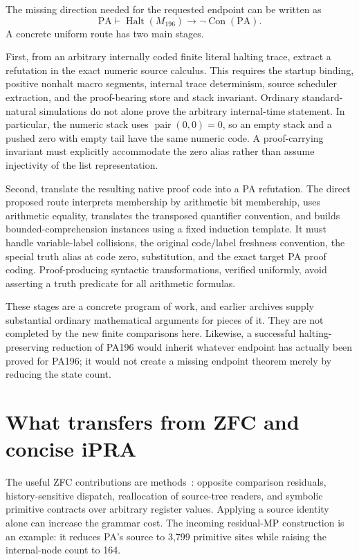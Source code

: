 \documentclass[11pt,letterpaper]{article}
\newcommand{\PA}{\mathrm{PA}}
\newcommand{\Con}{\operatorname{Con}}
\newcommand{\Halt}{\operatorname{Halt}}
\newcommand{\imp}{\mathbin{\to}}
\newcommand{\pair}{\operatorname{pair}}
\begin{document}
The missing direction needed for the requested endpoint can be written as
\[
 \PA\vdash\Halt(M_{196})\imp\neg\Con(\PA).
\]
A concrete uniform route has two main stages.

First, from an arbitrary internally coded finite literal halting trace,
extract a refutation in the exact numeric source calculus. This requires
the startup binding, positive nonhalt macro segments, internal trace
determinism, source scheduler extraction, and the proof-bearing store and
stack invariant. Ordinary standard-natural simulations do not alone prove
the arbitrary internal-time statement. In particular, the numeric stack
uses $\pair(0,0)=0$, so an empty stack and a pushed zero with empty tail have
the same numeric code. A proof-carrying invariant must explicitly accommodate
the zero alias rather than assume injectivity of the list representation.

Second, translate the resulting native proof code into a PA refutation.
The direct proposed route interprets membership by arithmetic bit membership,
uses arithmetic equality, translates the transposed quantifier convention,
and builds bounded-comprehension instances using a fixed induction template.
It must handle variable-label collisions, the original code/label freshness
convention, the special truth alias at code zero, substitution, and the
exact target PA proof coding. Proof-producing syntactic transformations,
verified uniformly, avoid asserting a truth predicate for all arithmetic
formulas.

These stages are a concrete program of work, and earlier archives supply
substantial ordinary mathematical arguments for pieces of it. They are not
completed by the new finite comparisons here. Likewise, a successful
halting-preserving reduction of PA196 would inherit whatever endpoint has
actually been proved for PA196; it would not create a missing endpoint
theorem merely by reducing the state count.

\section{What transfers from ZFC and concise iPRA}

The useful ZFC contributions are methods~\cite{zfc}: opposite comparison residuals,
history-sensitive dispatch, reallocation of source-tree readers, and symbolic
primitive contracts over arbitrary register values. Applying a source
identity alone can increase the grammar cost. The incoming residual-MP
construction is an example: it reduces PA's source to 3,799 primitive sites
while raising the internal-node count to 164.
\end{document}
